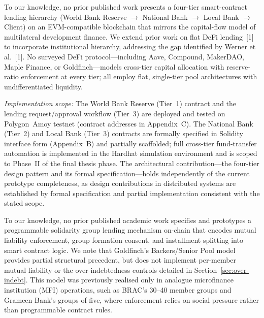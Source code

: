 \documentclass[12pt,a4paper]{report}
\begin{document}
\begin{description}[leftmargin=0pt]

\item[\textbf{Contribution 1 --- Four-Tier Hierarchical DeFi Architecture.}]
To our knowledge, no prior published work presents a four-tier smart-contract lending hierarchy (World Bank Reserve $\to$ National Bank $\to$ Local Bank $\to$ Client) on an EVM-compatible blockchain that mirrors the capital-flow model of multilateral development finance. We extend prior work on flat DeFi lending~[1] to incorporate institutional hierarchy, addressing the gap identified by Werner et al.~[1]. No surveyed DeFi protocol---including Aave, Compound, MakerDAO, Maple Finance, or Goldfinch---models cross-tier capital allocation with reserve-ratio enforcement at every tier; all employ flat, single-tier pool architectures with undifferentiated liquidity.

\textit{Implementation scope:} The World Bank Reserve (Tier~1) contract and the lending request/approval workflow (Tier~3) are deployed and tested on Polygon~Amoy testnet (contract addresses in Appendix~C). The National Bank (Tier~2) and Local Bank (Tier~3) contracts are formally specified in Solidity interface form (Appendix~B) and partially scaffolded; full cross-tier fund-transfer automation is implemented in the Hardhat simulation environment and is scoped to Phase~II of the final thesis phase. The architectural contribution---the four-tier design pattern and its formal specification---holds independently of the current prototype completeness, as design contributions in distributed systems are established by formal specification and partial implementation consistent with the stated scope.

\item[\textbf{Contribution 2 --- On-Chain Solidarity Group Lending.}]
To our knowledge, no prior published academic work specifies and prototypes a programmable solidarity group lending mechanism on-chain that encodes mutual liability enforcement, group formation consent, and installment splitting into smart contract logic. We note that Goldfinch's Backers/Senior Pool model provides partial structural precedent, but does not implement per-member mutual liability or the over-indebtedness controls detailed in Section~\ref{sec:over-indebt}. This model was previously realised only in analogue microfinance institution (MFI) operations, such as BRAC's 30--40 member groups and Grameen Bank's groups of five, where enforcement relies on social pressure rather than programmable contract rules.


\end{description}
\end{document}

